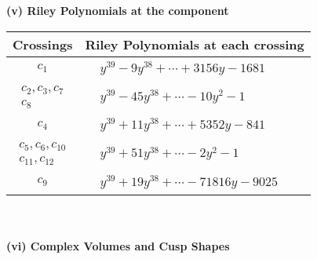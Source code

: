 \documentclass[1p]{elsarticle_modified}
\theoremstyle{definition}
\begin{document}
\newpage\renewcommand{\arraystretch}{1}
\flushleft \textbf{(v) Riley Polynomials at the component}\newline \\
\begin{tabular}{m{50pt}|m{274pt}}
Crossings & \hspace{64pt}Riley Polynomials at each crossing \\
\hline $$\begin{aligned}c_{1}\end{aligned}$$&$\begin{aligned}
&y^{39}-9 y^{38}+\cdots+3156 y-1681
\end{aligned}$\\
\hline $$\begin{aligned}c_{2},c_{3},c_{7}\\c_{8}\end{aligned}$$&$\begin{aligned}
&y^{39}-45 y^{38}+\cdots-10 y^2-1
\end{aligned}$\\
\hline $$\begin{aligned}c_{4}\end{aligned}$$&$\begin{aligned}
&y^{39}+11 y^{38}+\cdots+5352 y-841
\end{aligned}$\\
\hline $$\begin{aligned}c_{5},c_{6},c_{10}\\c_{11},c_{12}\end{aligned}$$&$\begin{aligned}
&y^{39}+51 y^{38}+\cdots-2 y^2-1
\end{aligned}$\\
\hline $$\begin{aligned}c_{9}\end{aligned}$$&$\begin{aligned}
&y^{39}+19 y^{38}+\cdots-71816 y-9025
\end{aligned}$\\
\hline
\end{tabular}\\~\\
\newpage\flushleft \textbf{(vi) Complex Volumes and Cusp Shapes}
\end{document}
